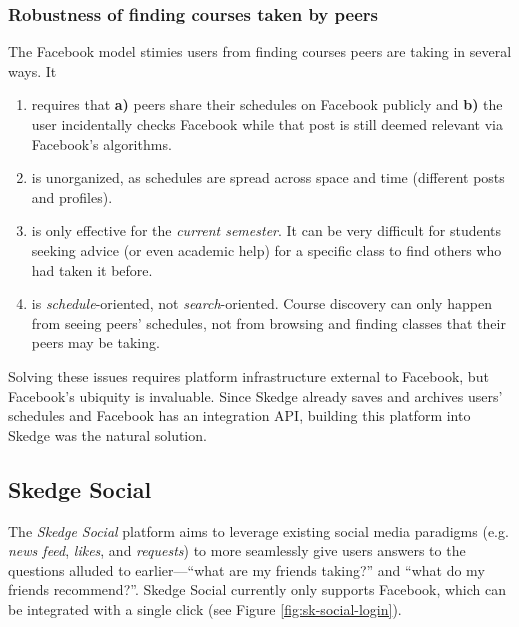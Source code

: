   \subsubsection{Robustness of finding courses taken by peers}

  The Facebook model stimies users from finding courses peers are taking in several ways. It

  \begin{enumerate}
    \item requires that \textbf{a)} peers share their schedules on Facebook publicly and \textbf{b)} the user incidentally checks Facebook while that post is still deemed relevant via Facebook's algorithms.

    \item is unorganized, as schedules are spread across space and time (different posts and profiles).

    \item is only effective for the \emph{current semester}. It can be very difficult for students seeking advice (or even academic help) for a specific class to find others who had taken it before.

    \item is \emph{schedule}-oriented, not \emph{search}-oriented. Course discovery can only happen from seeing peers' schedules, not from browsing and finding classes that their peers may be taking.

  \end{enumerate}

  \noindent Solving these issues requires platform infrastructure external to Facebook, but Facebook's ubiquity is invaluable. Since Skedge already saves and archives users' schedules and Facebook has an integration API, building this platform into Skedge was the natural solution.

 
\subsection{Skedge Social}

The \emph{Skedge Social} platform aims to leverage existing social media paradigms (e.g. \emph{news feed}, \emph{likes}, and \emph{requests}) to more seamlessly give users answers to the questions alluded to earlier---``what are my friends taking?'' and ``what do my friends recommend?''. Skedge Social currently only supports Facebook, which can be integrated with a single click (see Figure \ref{fig:sk-social-login}).
  
